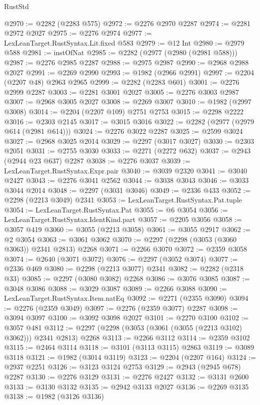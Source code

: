 \begin{lexlean}{RustStd}
\begin{coremodule}
@2970 := @2282 (@2283 @575)
@2972 := @2276 @2970 @2287
@2974 := @2281 @2972 @2027
@2975 := @2276 @2974
@2977 := LexLeanTarget.RustSyntax.Lit.fixed @583
@2979 := @12 Int
@2980 := @2979 @588
@2981 := instOfNat
@2985 := @2282 (@2977 (@2980 (@2981 @588)))
@2987 := @2276 @2985 @2287
@2988 := @2975 @2987
@2990 := @2968 @2988 @2027
@2991 := @2269 @2990
@2993 := @1982 (@2966 @2991)
@2997 := @2204 (@2207 @48) @2963 @2965
@2999 := @2282 (@2283 @601)
@3001 := @2276 @2999 @2287
@3003 := @2281 @3001 @2027
@3005 := @2276 @3003 @2987
@3007 := @2968 @3005 @2027
@3008 := @2269 @3007
@3010 := @1982 (@2997 @3008)
@3014 := @2204 (@2207 @109) @2751 @2753
@3015 := @2298 @2222
@3016 := @2303 @2145
@3017 := @3015 @3016
@3022 := @2282 (@2977 (@2979 @614 (@2981 @614)))
@3024 := @2276 @3022 @2287
@3025 := @2599 @3024
@3027 := @2968 @3025 @2014
@3029 := @2297 (@3017 @3027)
@3030 := @2303 @2051
@3031 := @2755 @3030
@3033 := @2271 (@2272 @632)
@3037 := @2943 (@2944 @23 @637) @2287
@3038 := @2276 @3037
@3039 := LexLeanTarget.RustSyntax.Expr.pair
@3040 := @3039 @2320
@3041 := @3040 @2427
@3043 := @2276 @3041 @2562
@3044 := @3038 @3043
@3046 := @3033 @3044 @2014
@3048 := @2297 (@3031 @3046)
@3049 := @2336 @433
@3052 := @2298 (@2213 @3049) @2341
@3053 := LexLeanTarget.RustSyntax.Pat.tuple
@3054 := LexLeanTarget.RustSyntax.Pat
@3055 := @6 @3054
@3056 := LexLeanTarget.RustSyntax.IdentKind.part
@3057 := @2205 @3056
@3058 := @3057 @419
@3060 := @3055 (@2213 @3058)
@3061 := @3055 @2917
@3062 := @2 @3054
@3063 := @3061 @3062
@3070 := @2297 (@2298 (@3053 (@3060 @3063)) @2341 @2813) @2268
@3071 := @2266 @3070
@3072 := @2359 @3058
@3074 := @2640 (@3071 @3072)
@3076 := @2297 (@3052 @3074)
@3077 := @2336 @469
@3080 := @2298 (@2213 @3077) @2341
@3082 := @2282 (@2318 @33)
@3085 := @2297 (@3080 @3082) @2268
@3086 := @3076 @3085
@3087 := @3048 @3086
@3088 := @3029 @3087
@3089 := @2266 @3088
@3090 := LexLeanTarget.RustSyntax.Item.natEq
@3092 := @2271 (@2355 @3090)
@3094 := @2276 (@2359 @3049)
@3097 := @2276 (@2359 @3077) @2287
@3098 := @3094 @3097
@3100 := @3092 @3098 @2027
@3101 := @2270 @3100
@3102 := @3057 @481
@3112 := @2297 (@2298 (@3053 (@3061 (@3055 (@2213 @3102) @3062))) @2341 @2813) @2268
@3113 := @2266 @3112
@3114 := @2359 @3102
@3115 := @2464 @3114
@3118 := @3101 (@3113 @3115) @2863
@3119 := @3089 @3118
@3121 := @1982 (@3014 @3119)
@3123 := @2204 (@2207 @164)
@3124 := @2937 @2251
@3126 := @3123 @3124 @2753
@3129 := @2943 (@2945 @678) @2287
@3130 := @2276 @3129
@3131 := @2276 @2427
@3132 := @3131 @2600
@3133 := @3130 @3132
@3135 := @2942 @3133 @2027
@3136 := @2269 @3135
@3138 := @1982 (@3126 @3136)

\end{coremodule}
\end{lexlean}

